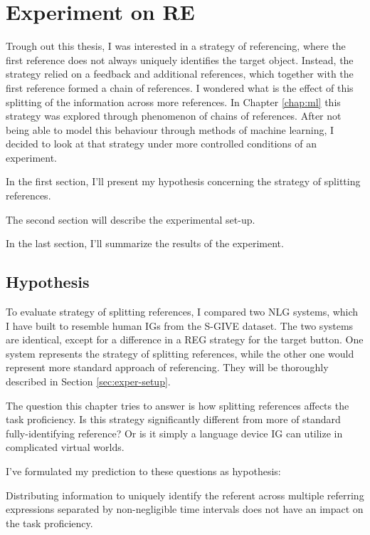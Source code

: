 \chapter{Experiment on RE}
Trough out this thesis, I was interested in a strategy of referencing, where the first reference does not always uniquely identifies the target object. Instead, the strategy relied on a feedback and additional references, which together with the first reference formed a chain of references. I wondered what is the effect of this splitting of the information across more references. In Chapter \ref{chap:ml} this strategy was explored through phenomenon of chains of references. After not being able to model this behaviour through methods of machine learning, I decided to look at that strategy under more controlled conditions of an experiment.

In the first section, I'll present my hypothesis concerning the strategy of splitting references. 

The second section will describe the experimental set-up. 

In the last section, I'll summarize the results of the experiment.

\section{Hypothesis}
To evaluate strategy of splitting references, I compared two NLG systems, which I have built to resemble human IGs from the S-GIVE dataset. The two systems are identical, except for a difference in a REG strategy for the target button. One system represents the strategy of splitting references, while the other one would represent more standard approach of referencing. They will be thoroughly described in Section \ref{sec:exper-setup}.

The question this chapter tries to answer is how splitting references affects the task proficiency. Is this strategy significantly different from more of standard fully-identifying reference? Or is it simply a language device IG can utilize in complicated virtual worlds.

I've formulated my prediction to these questions as hypothesis:

\begin{hypo}
Distributing information to uniquely identify the referent across multiple referring expressions separated by non-negligible time intervals does not have an impact on the task proficiency.
\end{hypo}

